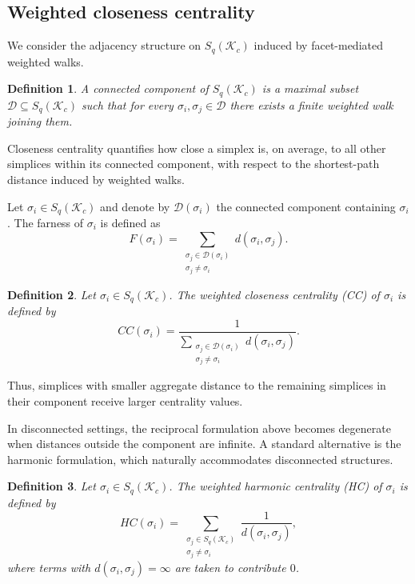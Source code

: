 \documentclass[12pt]{article}
\theoremstyle{normalhead_nobrackets}
\newtheorem{definition}{Definition}[section]
\theoremstyle{exampstyle}
\begin{document}
\subsection{Weighted closeness centrality}

We consider the adjacency structure on $S_q(\mathcal{K}_c)$ induced by facet-mediated weighted walks.

\begin{definition}
A connected component of $S_q(\mathcal{K}_c)$ is a maximal subset 
$\mathcal{D} \subseteq S_q(\mathcal{K}_c)$ such that for every 
$\sigma_i, \sigma_j \in \mathcal{D}$ there exists a finite weighted walk joining them.
\end{definition}

Closeness centrality quantifies how close a simplex is, on average, to all other simplices within its connected component, with respect to the shortest-path distance induced by weighted walks.

Let $\sigma_i \in S_q(\mathcal{K}_c)$ and denote by $\mathcal{D}(\sigma_i)$ the connected component containing $\sigma_i$. The {farness} of $\sigma_i$ is defined as
\[
F(\sigma_i)
=
\sum_{\substack{\sigma_j \in \mathcal{D}(\sigma_i) \\ \sigma_j \neq \sigma_i}}
d(\sigma_i,\sigma_j).
\]

\begin{definition}
Let $\sigma_i \in S_q(\mathcal{K}_c)$. 
The weighted closeness centrality (CC) of $\sigma_i$ is defined by
\[
CC(\sigma_i)
=
\frac{1}{\displaystyle 
\sum_{\substack{\sigma_j \in \mathcal{D}(\sigma_i) \\ \sigma_j \neq \sigma_i}}
d(\sigma_i,\sigma_j)}.
\]
\end{definition}

Thus, simplices with smaller aggregate distance to the remaining simplices in their component receive larger centrality values.

In disconnected settings, the reciprocal formulation above becomes degenerate when distances outside the component are infinite. A standard alternative is the harmonic formulation, which naturally accommodates disconnected structures.

\begin{definition}
Let $\sigma_i \in S_q(\mathcal{K}_c)$. 
The weighted harmonic centrality (HC) of $\sigma_i$ is defined by
\[
HC(\sigma_i)
=
\sum_{\substack{\sigma_j \in S_q(\mathcal{K}_c) \\ \sigma_j \neq \sigma_i}}
\frac{1}{d(\sigma_i,\sigma_j)},
\]
where terms with $d(\sigma_i,\sigma_j)=\infty$ are taken to contribute $0$.
\end{definition}
\end{document}
